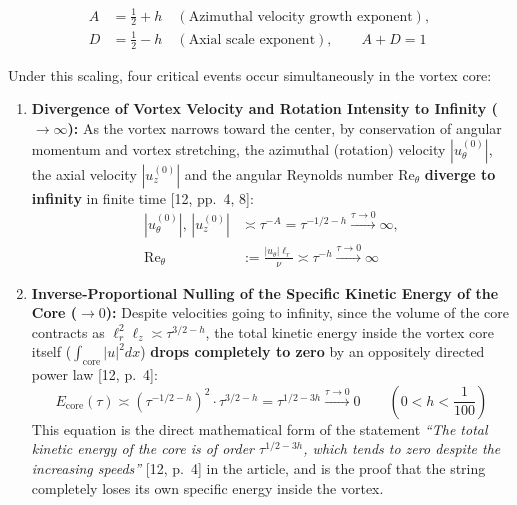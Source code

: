 \documentclass[12pt,a4paper]{article}
\begin{document}
\begin{equation}
\begin{split}
A &= \frac{1}{2} + h \quad (\text{Azimuthal velocity growth exponent}), \\
D &= \frac{1}{2} - h \quad (\text{Axial scale exponent}), \qquad A + D = 1
\end{split}
\end{equation}

Under this scaling, four critical events occur simultaneously in the vortex core:

\begin{enumerate}
    \item \textbf{Divergence of Vortex Velocity and Rotation Intensity to Infinity ($\to \infty$):} As the vortex narrows toward the center, by conservation of angular momentum and vortex stretching, the azimuthal (rotation) velocity $|u_\theta^{(0)}|$, the axial velocity $|u_z^{(0)}|$ and the angular Reynolds number $\text{Re}_\theta$ \textbf{diverge to infinity} in finite time [12, pp.\ 4, 8]:
    \begin{equation}
    \begin{split}
    |u_\theta^{(0)}|, \, |u_z^{(0)}| &\asymp \tau^{-A} = \tau^{-1/2 - h} \xrightarrow{\tau \to 0} \infty, \\
    \text{Re}_\theta &:= \frac{|u_\theta|\ell_r}{\nu} \asymp \tau^{-h} \xrightarrow{\tau \to 0} \infty
    \end{split}
    \end{equation}

    \item \textbf{Inverse-Proportional Nulling of the Specific Kinetic Energy of the Core ($\to 0$):} Despite velocities going to infinity, since the volume of the core contracts as $\ell_r^2 \ell_z \asymp \tau^{3/2 - h}$, the total kinetic energy inside the vortex core itself ($\int_{\text{core}} |u|^2 dx$) \textbf{drops completely to zero} by an oppositely directed power law [12, p.\ 4]:
    \begin{equation}
    E_{\text{core}}(\tau) \asymp \left(\tau^{-1/2-h}\right)^2 \cdot \tau^{3/2-h} = \tau^{1/2 - 3h} \xrightarrow{\tau \to 0} 0 \qquad \left(0 < h < \frac{1}{100}\right)
    \end{equation}
    This equation is the direct mathematical form of the statement \textit{``The total kinetic energy of the core is of order $\tau^{1/2-3h}$, which tends to zero despite the increasing speeds''} [12, p.\ 4] in the article, and is the proof that the string completely loses its own specific energy inside the vortex.


\end{enumerate}
\end{document}
